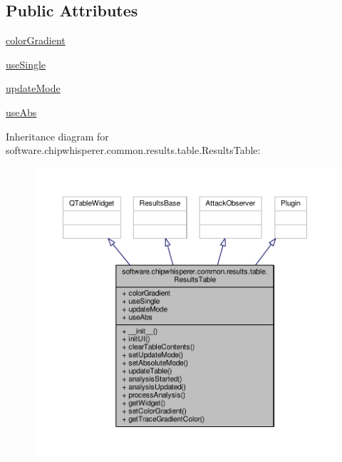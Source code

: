 \subsection*{Public Attributes}
\begin{DoxyCompactItemize}
\item 
\hyperlink{classsoftware_1_1chipwhisperer_1_1common_1_1results_1_1table_1_1ResultsTable_aabd91d9e1d0d90dfc46e9a115618fff8}{color\+Gradient}
\item 
\hyperlink{classsoftware_1_1chipwhisperer_1_1common_1_1results_1_1table_1_1ResultsTable_ac71e121cdf8a0ec6782af46acfce6666}{use\+Single}
\item 
\hyperlink{classsoftware_1_1chipwhisperer_1_1common_1_1results_1_1table_1_1ResultsTable_ad146fa0755cb7ccb58e25e833943496c}{update\+Mode}
\item 
\hyperlink{classsoftware_1_1chipwhisperer_1_1common_1_1results_1_1table_1_1ResultsTable_aa657c2b4e520ba88b9a3092e72dae859}{use\+Abs}
\end{DoxyCompactItemize}


Inheritance diagram for software.\+chipwhisperer.\+common.\+results.\+table.\+Results\+Table\+:\nopagebreak
\begin{figure}[H]
\begin{center}
\leavevmode
\includegraphics[width=350pt]{d9/d87/classsoftware_1_1chipwhisperer_1_1common_1_1results_1_1table_1_1ResultsTable__inherit__graph}
\end{center}
\end{figure}


